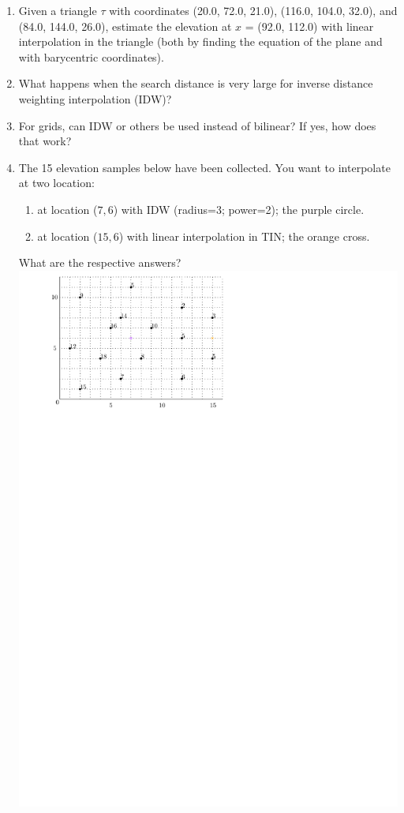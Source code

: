 \begin{enumerate}
  \item Given a triangle $\tau$ with coordinates (20.0, 72.0, 21.0), (116.0, 104.0, 32.0), and (84.0, 144.0, 26.0), estimate the elevation at $x$ = (92.0, 112.0) with linear interpolation in the triangle (both by finding the equation of the plane and with barycentric coordinates).
  \item What happens when the search distance is very large for inverse distance weighting interpolation (IDW)?
  \item For grids, can IDW or others be used instead of bilinear? If yes, how does that work?
  \item The 15 elevation samples below have been collected. You want to interpolate at two location:
  \begin{enumerate}
    \item at location ($7,6$) with IDW (radius=3; power=2); the purple circle.
    \item at location ($15,6$) with linear interpolation in TIN; the orange cross.
  \end{enumerate} 
  What are the respective answers?
  \\
  \includegraphics[width=0.9\linewidth]{figs/interpol}
\end{enumerate}

